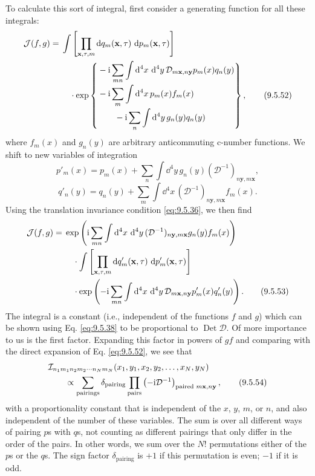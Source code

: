 To calculate this sort of integral, first consider a generating function for
all these integrals:
\begin{align}
\mathcal{J}(f,g)
={}&\int\left[\prod_{\mathbf{x},\tau,m}
 \mathop{}\!\mathrm{d} q_m(\mathbf{x},\tau)\,\mathop{}\!\mathrm{d} p_m(\mathbf{x},\tau)\right]
\notag\\
&\quad\cdot\exp\left\{\begin{aligned}
 &-\mathrm{i}\sum_{mn}\int \mathop{}\!\mathrm{d}^4x\,\mathop{}\!\mathrm{d}^4y\,
 \mathcal{D}_{m\mathbf{x},n\mathbf{y}}p_m(x)q_n(y)\\[-2pt]
&-\mathrm{i}\sum_m\int \mathop{}\!\mathrm{d}^4x\,p_m(x)f_m(x)\\[-2pt]
&\qquad{}-\mathrm{i}\sum_n\int \mathop{}\!\mathrm{d}^4y\,g_n(y)q_n(y)
 \end{aligned}\right\},
\tag{9.5.52}\label{eq:9.5.52}
\end{align}
where $f_m(x)$ and $g_n(y)$ are arbitrary anticommuting c-number functions.
We shift to new variables of integration
\[
p'_m(x)=p_m(x)+\sum_n\int \dd^4y\,
 g_n(y)(\mathcal{D}^{-1})_{n\mathbf{y},m\mathbf{x}},
\]
\[
q'_n(y)=q_n(y)+\sum_m\int \dd^4x\,
 (\mathcal{D}^{-1})_{n\mathbf{y},m\mathbf{x}}f_m(x).
\]
Using the translation invariance condition \eqref{eq:9.5.36}, we then find
\begin{align}
\mathcal{J}(f,g)
={}&\exp\left(\mathrm{i}\sum_{mn}\int \mathop{}\!\mathrm{d}^4x\,\mathop{}\!\mathrm{d}^4y\,
 (\mathcal{D}^{-1})_{n\mathbf{y},m\mathbf{x}}g_n(y)f_m(x)\right)
\notag\\
&\quad\cdot\int\left[\prod_{\mathbf{x},\tau,m}
 \mathop{}\!\mathrm{d} q'_m(\mathbf{x},\tau)\,\mathop{}\!\mathrm{d} p'_m(\mathbf{x},\tau)\right]
\notag\\
&\quad\cdot\exp\left(-\mathrm{i}\sum_{mn}\int \mathop{}\!\mathrm{d}^4x\,\mathop{}\!\mathrm{d}^4y\,
 \mathcal{D}_{m\mathbf{x},n\mathbf{y}}p'_m(x)q'_n(y)\right).
\tag{9.5.53}\label{eq:9.5.53}
\end{align}
The integral is a constant (i.e., independent of the functions $f$ and $g$)
which can be shown using Eq. \eqref{eq:9.5.38} to be proportional to
$\operatorname{Det}\mathcal{D}$. Of more importance to us is the first factor.
Expanding this factor in powers of $gf$ and comparing with the direct expansion
of Eq. \eqref{eq:9.5.52}, we see that
\begin{align}
&\mathcal{I}_{n_1m_1n_2m_2\cdots n_Nm_N}
 (x_1,y_1,x_2,y_2,\ldots,x_N,y_N)
\notag\\
&\qquad\propto\sum_{\text{pairings}}\delta_{\text{pairing}}
 \prod_{\text{pairs}}
 \left(-\mathrm{i}\mathcal{D}^{-1}\right)_{\text{paired }m\mathbf{x},n\mathbf{y}},
\tag{9.5.54}\label{eq:9.5.54}
\end{align}
with a proportionality constant that is independent of the $x$, $y$, $m$, or
$n$, and also independent of the number of these variables. The sum is over
all different ways of pairing $p$s with $q$s, not counting as different
pairings that only differ in the order of the pairs. In other words, we sum
over the $N!$ permutations either of the $p$s or the $q$s. The sign factor
$\delta_{\text{pairing}}$ is $+1$ if this permutation is even; $-1$ if it is
odd.

